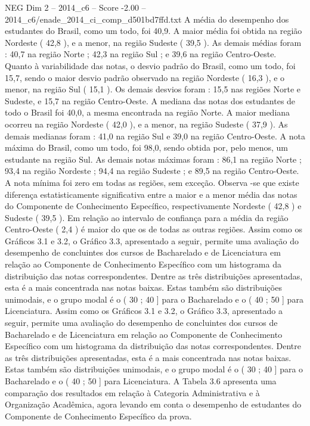 \begin{textsample}{NEG Dim 2 – 2014\_c6 – Score -2.00 – 2014\_c6/enade\_2014\_ci\_comp\_d501bd7ffd.txt}
A média do desempenho dos estudantes do Brasil, como um todo, foi 40,9.
A maior média foi obtida na região Nordeste ( 42,8 ), e a menor, na região Sudeste ( 39,5 ).
As demais médias foram : 40,7 na região Norte ; 42,3 na região Sul ; e 39,6 na região Centro-Oeste.
Quanto à variabilidade das notas, o desvio padrão do Brasil, como um todo, foi 15,7, sendo o maior desvio padrão observado na região Nordeste ( 16,3 ), e o menor, na região Sul ( 15,1 ).
Os demais desvios foram : 15,5 nas regiões Norte e Sudeste, e 15,7 na região Centro-Oeste.
A mediana das notas dos estudantes de todo o Brasil foi 40,0, a mesma encontrada na região Norte.
A maior mediana ocorreu na região Nordeste ( 42,0 ), e a menor, na região Sudeste ( 37,9 ).
As demais medianas foram : 41,0 na região Sul e 39,0 na região Centro-Oeste.
A nota máxima do Brasil, como um todo, foi 98,0, sendo obtida por, pelo menos, um estudante na região Sul.
As demais notas máximas foram : 86,1 na região Norte ; 93,4 na região Nordeste ; 94,4 na região Sudeste ; e 89,5 na região Centro-Oeste.
A nota mínima foi zero em todas as regiões, sem exceção.
Observa -se que existe diferença estatisticamente significativa entre a maior e a menor média das notas do Componente de Conhecimento Específico, respectivamente Nordeste ( 42,8 ) e Sudeste ( 39,5 ).
Em relação ao intervalo de confiança para a média da região Centro-Oeste ( 2,4 ) é maior do que os de todas as outras regiões.
Assim como os Gráficos 3.1 e 3.2, o Gráfico 3.3, apresentado a seguir, permite uma avaliação do desempenho de concluintes dos cursos de Bacharelado e de Licenciatura em relação ao Componente de Conhecimento Específico com um histograma da distribuição das notas correspondentes.
Dentre as três distribuições apresentadas, esta é a mais concentrada nas notas baixas.
Estas também são distribuições unimodais, e o grupo modal é o ( 30 ; 40 ] para o Bacharelado e o ( 40 ; 50 ] para Licenciatura.
Assim como os Gráficos 3.1 e 3.2, o Gráfico 3.3, apresentado a seguir, permite uma avaliação do desempenho de concluintes dos cursos de Bacharelado e de Licenciatura em relação ao Componente de Conhecimento Específico com um histograma da distribuição das notas correspondentes.
Dentre as três distribuições apresentadas, esta é a mais concentrada nas notas baixas.
Estas também são distribuições unimodais, e o grupo modal é o ( 30 ; 40 ] para o Bacharelado e o ( 40 ; 50 ] para Licenciatura.
A Tabela 3.6 apresenta uma comparação dos resultados em relação à Categoria Administrativa e à Organização Acadêmica, agora levando em conta o desempenho de estudantes do Componente de Conhecimento Específico da prova.

\end{textsample}
